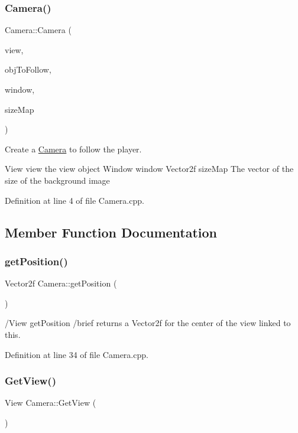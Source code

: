 \subsubsection{\texorpdfstring{Camera()}{Camera()}}
{\footnotesize\ttfamily Camera\+::\+Camera (\begin{DoxyParamCaption}\item[{View \&}]{view,  }\item[{\hyperlink{class_player}{Player} \&}]{obj\+To\+Follow,  }\item[{Render\+Window \&}]{window,  }\item[{const Vector2f \&}]{size\+Map }\end{DoxyParamCaption})}



Create a \hyperlink{class_camera}{Camera} to follow the player. 

View view the view object Window window Vector2f size\+Map The vector of the size of the background image 

Definition at line 4 of file Camera.\+cpp.



\subsection{Member Function Documentation}
\mbox{\label{class_camera_ab3b9ec6e34ef3b004d9061d96d71302f}} 
\subsubsection{\texorpdfstring{get\+Position()}{getPosition()}}
{\footnotesize\ttfamily Vector2f Camera\+::get\+Position (\begin{DoxyParamCaption}{ }\end{DoxyParamCaption})}

/\+View get\+Position /brief returns a Vector2f for the center of the view linked to this. 

Definition at line 34 of file Camera.\+cpp.

\mbox{\label{class_camera_a14474d1aabd7268f7aa922fe30647365}} 
\subsubsection{\texorpdfstring{Get\+View()}{GetView()}}
{\footnotesize\ttfamily View Camera\+::\+Get\+View (\begin{DoxyParamCaption}{ }\end{DoxyParamCaption})}

